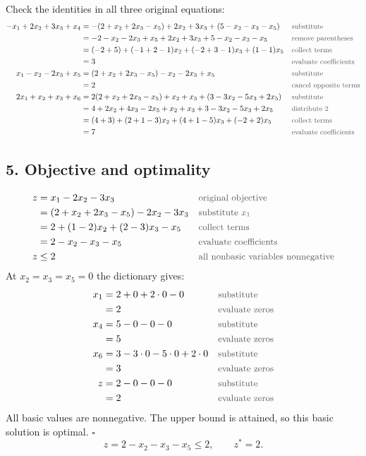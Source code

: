 \documentclass[a4paper,11pt]{article}
\newif\ifexplain
\newcommand{\teil}[1]{\subsection*{#1}}
\newcommand{\why}[1]{\text{\small\color{black!65}#1}}
\newcommand{\explain}[1]{\ifexplain\begin{erklbox}#1\end{erklbox}\fi}
\begin{document}
Check the identities in all three original equations:
\begingroup\small
\begin{align*}
-x_1+2x_2+3x_3+x_4&=-(2+x_2+2x_3-x_5)+2x_2+3x_3+(5-x_2-x_3-x_5)&&\why{substitute}\\
&=-2-x_2-2x_3+x_5+2x_2+3x_3+5-x_2-x_3-x_5&&\why{remove parentheses}\\
&=(-2+5)+(-1+2-1)x_2+(-2+3-1)x_3+(1-1)x_5&&\why{collect terms}\\
&=3&&\why{evaluate coefficients}\\
x_1-x_2-2x_3+x_5&=(2+x_2+2x_3-x_5)-x_2-2x_3+x_5&&\why{substitute}\\
&=2&&\why{cancel opposite terms}\\
2x_1+x_2+x_3+x_6&=2(2+x_2+2x_3-x_5)+x_2+x_3+(3-3x_2-5x_3+2x_5)&&\why{substitute}\\
&=4+2x_2+4x_3-2x_5+x_2+x_3+3-3x_2-5x_3+2x_5&&\why{distribute $2$}\\
&=(4+3)+(2+1-3)x_2+(4+1-5)x_3+(-2+2)x_5&&\why{collect terms}\\
&=7&&\why{evaluate coefficients}
\end{align*}
\endgroup

\teil{5. Objective and optimality}
\begin{align*}
z&=x_1-2x_2-3x_3&&\why{original objective}\\
&=(2+x_2+2x_3-x_5)-2x_2-3x_3&&\why{substitute $x_1$}\\
&=2+(1-2)x_2+(2-3)x_3-x_5&&\why{collect terms}\\
&=2-x_2-x_3-x_5&&\why{evaluate coefficients}\\
z&\leq2&&\why{all nonbasic variables nonnegative}
\end{align*}
At $x_2=x_3=x_5=0$ the dictionary gives:
\begin{align*}
x_1&=2+0+2\cdot0-0&&\why{substitute}\\
&=2&&\why{evaluate zeros}\\
x_4&=5-0-0-0&&\why{substitute}\\
&=5&&\why{evaluate zeros}\\
x_6&=3-3\cdot0-5\cdot0+2\cdot0&&\why{substitute}\\
&=3&&\why{evaluate zeros}\\
z&=2-0-0-0&&\why{substitute}\\
&=2&&\why{evaluate zeros}
\end{align*}
All basic values are nonnegative. The upper bound is attained, so this basic solution is optimal. $\square$
\[\boxed{z=2-x_2-x_3-x_5\leq2,\qquad z^*=2.}\]
\explain{Die Koeffizienten der Nichtbasisvariablen in dieser Zielfunktionszeile heißen reduzierte Kosten. Alle drei sind negativ. Weil die Variablen nichtnegativ sind, kann kein zulässiger Punkt mehr als $2$ erreichen. Unsere Basislösung erreicht genau diesen Wert. Das ist eine globale Schranke und beweist daher mehr als nur das Fehlen eines besseren einzelnen Schritts. Entscheidend ist, dass wir dieselbe Zielfunktion durch Einsetzen nur anders geschrieben haben, sodass diese Schranke für sämtliche zulässigen Lösungen gilt und nicht bloß für die gerade untersuchte Bewegung entlang einer Kante.}
\end{document}
